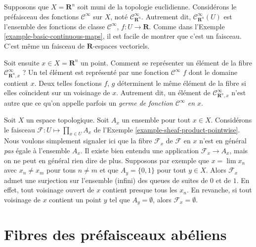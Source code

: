 \begin{example}
\label{example-germs-functions}
Supposons que $X = \mathbf{R}^n$ soit muni de la topologie euclidienne.
Considérons le préfaisceau des fonctions $\mathcal{C}^\infty$
sur $X$, noté $\mathcal{C}^\infty_{\mathbf{R}^n}$.
Autrement dit, $\mathcal{C}^\infty_{\mathbf{R}^n}(U)$ est l'ensemble
des fonctions de classe $\mathcal{C}^\infty$, $f : U \to \mathbf{R}$.
Comme dans l'Exemple \ref{example-basic-continuous-maps},
il est facile de montrer que c'est un faisceau. C'est même
un faisceau de $\mathbf{R}$-espaces vectoriels.

\medskip\noindent
Soit ensuite $x \in X = \mathbf{R}^n$ un point. Comment
se représenter un élément de la fibre $\mathcal{C}^\infty_{\mathbf{R}^n, x}$ ?
Un tel élément est représenté par une fonction $\mathcal{C}^\infty$
$f$ dont le domaine contient $x$. Deux telles
fonctions $f$, $g$ déterminent
le même élément de la fibre si elles coïncident sur un voisinage
de $x$. Autrement dit, un élément de $\mathcal{C}^\infty_{\mathbf{R}^n, x}$
n'est autre que ce qu'on appelle parfois
un {\it germe de fonction $\mathcal{C}^\infty$ en $x$}.
\end{example}

\begin{example}
\label{example-sheaf-product-pointwise-stalk}
Soit $X$ un espace topologique. Soit $A_x$ un ensemble pour tout $x \in X$.
Considérons le faisceau $\mathcal{F} : U \mapsto \prod_{x\in U} A_x$ de l'Exemple
\ref{example-sheaf-product-pointwise}. Nous voulons simplement signaler
ici que la fibre $\mathcal{F}_x$ de $\mathcal{F}$ en $x$
n'est en général {\it pas} égale à l'ensemble $A_x$. Il existe bien entendu
une application $\mathcal{F}_x \to A_x$, mais on ne peut en général rien dire
de plus. Supposons par exemple que $x = \lim x_n$ avec $x_n \not = x_m$ pour
tous $n \not = m$ et que $A_y = \{0, 1\}$ pour tout $y \in X$. Alors
$\mathcal{F}_x$ admet une surjection sur l'ensemble (infini) des queues de suites
de $0$ et de $1$. En effet, tout voisinage ouvert de $x$ contient presque
tous les $x_n$. En revanche, si tout voisinage de $x$ contient
un point $y$ tel que $A_y = \emptyset$, alors $\mathcal{F}_x = \emptyset$.
\end{example}



\section{Fibres des préfaisceaux abéliens}
\label{section-stalks-abelian-presheaves}

